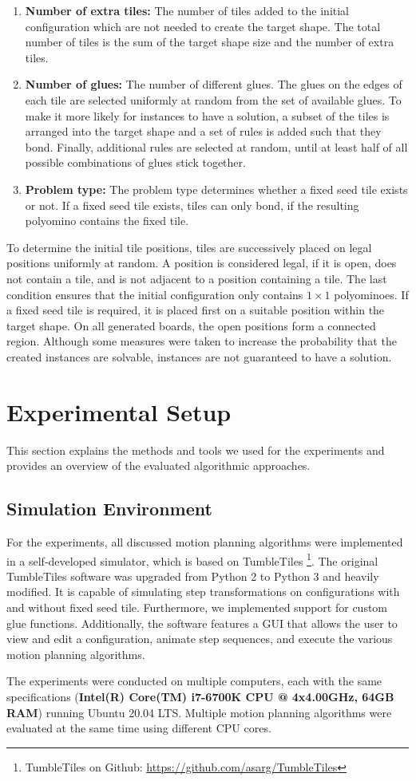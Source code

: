 \begin{enumerate}
\item \textbf{Number of extra tiles:}
The number of tiles added to the initial configuration which are not needed to create the target shape. The total number of tiles is the sum of the target shape size and the number of extra tiles.
\item \textbf{Number of glues:}
The number of different glues. The glues on the edges of each tile are selected uniformly at random from the set of available glues. To make it more likely for instances to have a solution, a subset of the tiles is arranged into the target shape and a set of rules is added such that they bond. Finally, additional rules are selected at random, until at least half of all possible combinations of glues stick together.
\item \textbf{Problem type:}
The problem type determines whether a fixed seed tile exists or not. If a fixed seed tile exists, tiles can only bond, if the resulting polyomino contains the fixed tile.
\end{enumerate}

To determine the initial tile positions, tiles are successively placed on legal positions uniformly at random. A position is considered legal, if it is open, does not contain a tile, and is not adjacent to a position containing a tile. The last condition ensures that the initial configuration only contains $1 \times 1$ polyominoes. If a fixed seed tile is required, it is placed first on a suitable position within the target shape. On all generated boards, the open positions form a connected region. Although some measures were taken to increase the probability that the created instances are solvable, instances are not guaranteed to have a solution.

\section{Experimental Setup}
This section explains the methods and tools we used for the experiments and provides an overview of the evaluated algorithmic approaches.

\subsection{Simulation Environment}
For the experiments, all discussed motion planning algorithms were implemented in a self-developed simulator, which is based on TumbleTiles \footnote{TumbleTiles on Github: \url{https://github.com/asarg/TumbleTiles}}. The original TumbleTiles software was upgraded from Python 2 to Python 3 and heavily modified. It is capable of simulating step transformations on configurations with and without fixed seed tile. Furthermore, we implemented support for custom glue functions. Additionally, the software features a GUI that allows the user to view and edit a configuration, animate step sequences, and execute the various motion planning algorithms. \par
The experiments were conducted on multiple computers, each with the same specifications (\textbf{Intel(R) Core(TM) i7-6700K CPU @ 4x4.00GHz, 64GB RAM}) running Ubuntu 20.04 LTS. Multiple motion planning algorithms were evaluated at the same time using different CPU cores.

